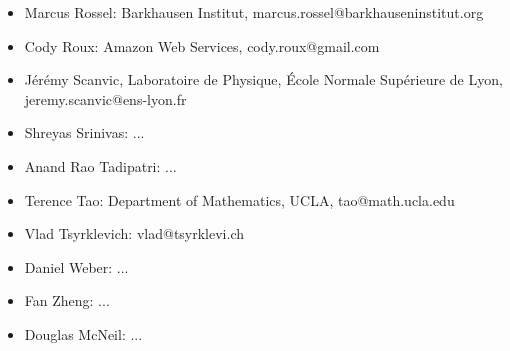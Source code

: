 \begin{itemize}
    \item Marcus Rossel: Barkhausen Institut, marcus.rossel@barkhauseninstitut.org
    \item Cody Roux: Amazon Web Services, cody.roux@gmail.com
    \item J\'er\'emy Scanvic, Laboratoire de Physique, École Normale Supérieure de Lyon, jeremy.scanvic@ens-lyon.fr
    \item Shreyas Srinivas: ...
    \item Anand Rao Tadipatri: ...
    \item Terence Tao: Department of Mathematics, UCLA, tao@math.ucla.edu
    \item Vlad Tsyrklevich: vlad@tsyrklevi.ch
    \item Daniel Weber: ...
    \item Fan Zheng: ...
    \item Douglas McNeil: ...
\end{itemize}
